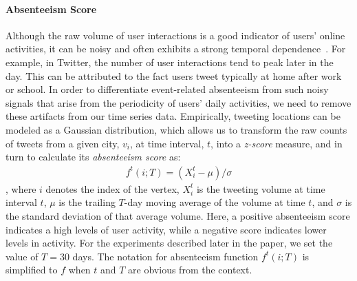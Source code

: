 \vspace{-1mm}
\paragraph{\textbf{Absenteeism Score}}
Although the raw volume of user interactions is a good indicator of users' online activities, it can be noisy and often exhibits a strong temporal dependence~\cite{cho2011friendship}.
For example, in Twitter, the number of user interactions tend to peak later in the day.
This can be attributed to the fact users tweet typically at home after work or school.
In order to differentiate event-related absenteeism from such noisy signals that arise from the periodicity of users' daily activities, we need to remove these artifacts from our time series data.
Empirically, tweeting locations can be modeled as a Gaussian distribution, which allows us to transform the raw counts of tweets from a given city, $v_{i}$, at time interval, $t$, into a \textit{z-score} measure, and in turn to calculate its \textit{absenteeism score} as:
\begin{equation}
	\label{eq:zscore}
	\begin{array}{l}
		f^t(i;T) =(X^t_i-\mu)/{\sigma}
	\end{array}
\end{equation}
, where $i$ denotes the index of the vertex, $X^t_i$ is the tweeting volume at time interval $t$, $\mu$ is the trailing $T$-day moving average of the volume at time $t$, and $\sigma$ is the standard deviation of that average volume.
Here, a positive absenteeism score indicates a high levels of user activity, while a negative score indicates lower levels in activity.
For the experiments described later in the paper, we set the value of $T=30$ days. The notation for absenteeism function $f^t(i;T)$ is simplified to $f$ when $t$ and $T$ are obvious from the context.
